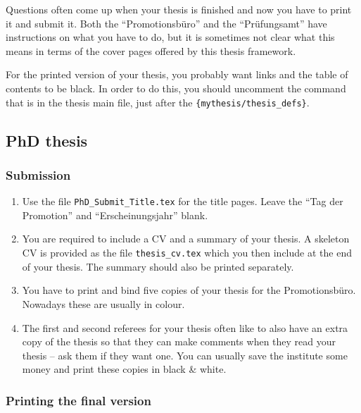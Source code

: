 Questions often come up when your thesis is finished and now you have
to print it and submit it. Both the
\foreignquote{ngerman}{Promotionsbüro} and the
\foreignquote{ngerman}{Prüfungsamt} have instructions on what you have
to do, but it is sometimes not clear what this means in terms of the
cover pages offered by this thesis framework.

For the printed version of your thesis, you probably want
 links and the table of contents to be black. In
order to do this, you should uncomment the  command
that is in the thesis main file, just after the
\texttt{\{mythesis/thesis\_defs\}}.


\subsection{PhD thesis}
\label{sec:tips:submit:phd}

\subsubsection{Submission}

\begin{enumerate}
\item Use the file \texttt{PhD\_Submit\_Title.tex} for the title
  pages. Leave the \foreignquote{ngerman}{Tag der Promotion} and
  \foreignquote{ngerman}{Erscheinungsjahr} blank.
\item You are required to include a CV and a summary of your
  thesis. A skeleton CV is provided as the file
  \texttt{thesis\_cv.tex} which you then include at the end of your
  thesis. The summary should also be printed separately.
\item You have to print and bind five copies of your thesis for the
  \foreignlanguage{ngerman}{Promotionsbüro}. Nowadays these are
  usually in colour.
\item The first and second referees for your thesis often like to also
  have an extra copy of the thesis so that they can make comments when they read
  your thesis -- ask them if they want one. You can usually save the
  institute some money and print these copies in black \& white.
\end{enumerate}


\subsubsection{Printing the final version}

